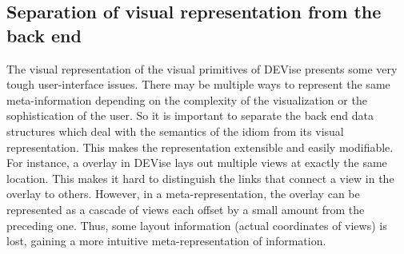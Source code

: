 \subsection{Separation of visual representation from the back end}

The visual representation of the visual primitives of DEVise presents
some very tough user-interface issues. There may be multiple ways
to represent the same meta-information depending on the complexity of
the visualization or the sophistication of the user. So it is important
to separate the back end data structures which deal with the semantics of the 
idiom from its visual representation. This makes the representation 
extensible and easily modifiable. For instance, a overlay in DEVise 
lays out multiple views at exactly the same location. This makes it
hard to distinguish the links that connect a view in the overlay to others.
However, in a meta-representation, the overlay can be represented as a
cascade of views each offset by a small amount from the preceding one. Thus,
some layout information (actual coordinates of views) is lost, gaining
a more intuitive meta-representation of information.
